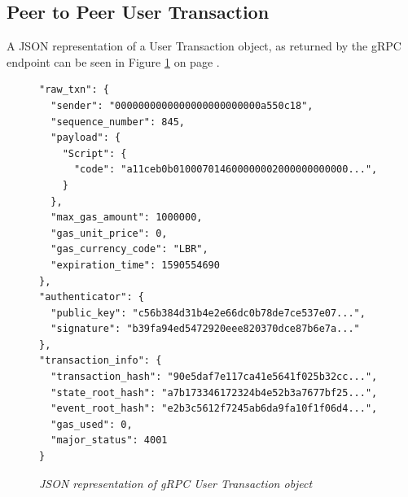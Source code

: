 \documentclass[12pt,openany,a4paper]{book}
\begin{document}
\subsection{Peer to Peer User Transaction}
A JSON representation of a User Transaction object, as returned by the gRPC
endpoint can be seen in Figure \ref{grpc_p2p} on page \pageref{grpc_p2p}.
\begin{figure}[h!]
    \caption{\sl JSON representation of gRPC User Transaction object}
    \centering
    \label{grpc_p2p}

\begin{verbatim}
"raw_txn": {
  "sender": "0000000000000000000000000a550c18",
  "sequence_number": 845,
  "payload": {
    "Script": {
      "code": "a11ceb0b010007014600000002000000000000...",
    }
  },
  "max_gas_amount": 1000000,
  "gas_unit_price": 0,
  "gas_currency_code": "LBR",
  "expiration_time": 1590554690
},
"authenticator": {
  "public_key": "c56b384d31b4e2e66dc0b78de7ce537e07...",
  "signature": "b39fa94ed5472920eee820370dce87b6e7a..."
},
"transaction_info": {
  "transaction_hash": "90e5daf7e117ca41e5641f025b32cc...",
  "state_root_hash": "a7b173346172324b4e52b3a7677bf25...",
  "event_root_hash": "e2b3c5612f7245ab6da9fa10f1f06d4...",
  "gas_used": 0,
  "major_status": 4001
}
\end{verbatim}
\end{figure}



\cleardoublepage

\printbibliography 
\end{document}
